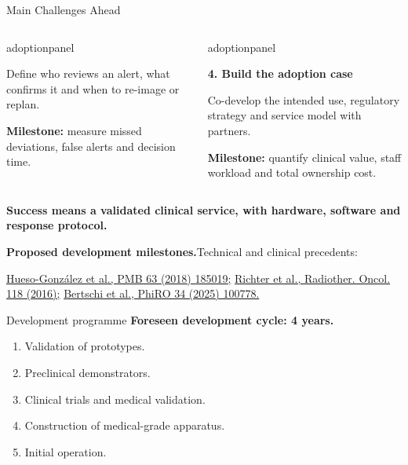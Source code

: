 \documentclass[aspectratio=169,11pt]{beamer}
\newcommand{\hi}[1]{\textcolor{crRed}{#1}}
\begin{document}
\begin{frame}{Main Challenges Ahead}
\begin{columns}[T,onlytextwidth]
\begin{beamercolorbox}[sep=6pt,wd=\linewidth]{adoptionpanel}
\begin{minipage}[t][1.65cm][t]{\linewidth}
\vspace{0.07cm}
{\scriptsize Define who reviews an alert, what confirms it and when to re-image or replan.\par\vspace{0.08cm}\textbf{Milestone:} measure missed deviations, false alerts and decision time.\par}
\end{minipage}
\end{beamercolorbox}
\begin{beamercolorbox}[sep=6pt,wd=\linewidth]{adoptionpanel}
\begin{minipage}[t][1.65cm][t]{\linewidth}\raggedright
{\footnotesize\bfseries\color{crBlue}4. Build the adoption case\par}
\vspace{0.07cm}
{\scriptsize Co-develop the intended use, regulatory strategy and service model with partners.\par\vspace{0.08cm}\textbf{Milestone:} quantify clinical value, staff workload and total ownership cost.\par}
\end{minipage}
\end{beamercolorbox}
\end{columns}

\vspace{0.16cm}
{\footnotesize\bfseries\color{darkred}
Success means a validated clinical service, with hardware, software and response protocol.\par}
\vfill
{\fontsize{6}{7}\selectfont\color{crGrey}\raggedright
\textbf{Proposed development milestones.}\quad Technical and clinical precedents:\par
\href{https://doi.org/10.1088/1361-6560/aad513}
{Hueso-Gonz\'alez et al., PMB 63 (2018) 185019;}\quad
\href{https://doi.org/10.1016/j.radonc.2016.01.004}
{Richter et al., Radiother. Oncol. 118 (2016);}\quad
\href{https://doi.org/10.1016/j.phro.2025.100778}
{Bertschi et al., PhiRO 34 (2025) 100778.}\par
}
\end{frame}

\begin{frame}{Development programme}
\small
\textbf{Foreseen development cycle: \hi{4 years}.}
\par\vspace{3mm}
\begin{enumerate}
\item Validation of prototypes.
\item Preclinical demonstrators.
\item Clinical trials and medical validation.
\item Construction of medical-grade apparatus.
\item Initial operation.
\end{enumerate}
\end{frame}


\end{document}
